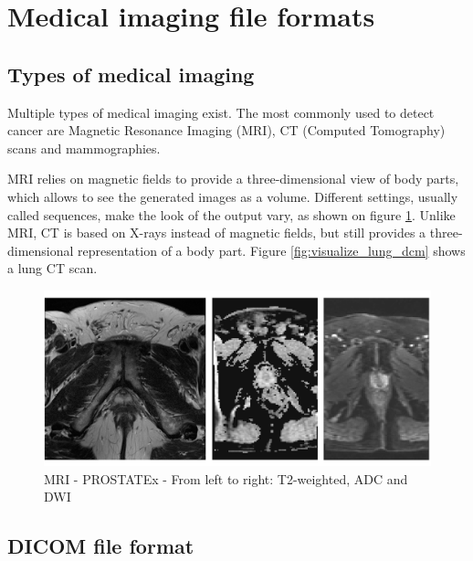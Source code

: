 
\section{Medical imaging file formats}
\subsection{Types of medical imaging}
\label{sec:medical_imaging}

Multiple types of medical imaging exist. The most commonly used to detect cancer are Magnetic Resonance Imaging (MRI), CT (Computed Tomography) scans
and mammographies. 

MRI relies on magnetic fields to provide a three-dimensional view of body parts, which allows to see the generated images as a volume. Different settings, usually called sequences, make the look of the output vary, as shown on figure \ref{fig:PROSTATEx-t2-adc-dwi}.
Unlike MRI, CT is based on X-rays instead of magnetic fields, but still provides a three-dimensional representation of a body part. Figure \ref{fig:visualize_lung_dcm} shows a lung CT scan.

\begin{figure}[!h]
\centering
\includegraphics[width=1\textwidth, keepaspectratio=true]{./figures/PROSTATEx-t2-adc-dwi.png}
\caption{MRI - PROSTATEx - From left to right: T2-weighted, ADC and DWI}
\label{fig:PROSTATEx-t2-adc-dwi}
\end{figure}

\subsection{DICOM file format}
\label{sec:DICOM}


